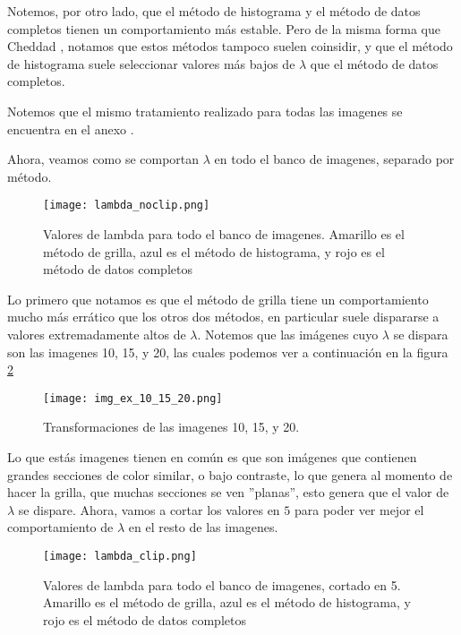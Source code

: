     Notemos, por otro lado, que el m\'etodo de histograma y el m\'etodo de datos completos tienen un comportamiento m\'as estable. Pero de la misma forma que Cheddad \cite{boxcoximg}, notamos que estos m\'etodos tampoco suelen coinsidir, y que el m\'etodo de histograma suele seleccionar valores m\'as bajos de $\lambda$ que el m\'etodo de datos completos.

    Notemos que el mismo tratamiento realizado para todas las imagenes se encuentra en el anexo .
    
    Ahora, veamos como se comportan $\lambda$ en todo el banco de imagenes, separado por m\'etodo.

    \begin{figure}[H]
        \texttt{[image: lambda\_noclip.png]}
        \caption{Valores de lambda para todo el banco de imagenes. Amarillo es el m\'etodo de grilla, azul es el m\'etodo de histograma, y rojo es el m\'etodo de datos completos}
        \label{fig:lambda_noclip}
    \end{figure}

    Lo primero que notamos es que el m\'etodo de grilla tiene un comportamiento mucho m\'as err\'atico que los otros dos m\'etodos, en particular suele dispararse a valores extremadamente altos de $\lambda$. Notemos que las im\'agenes cuyo $\lambda$ se dispara son las imagenes 10, 15, y 20, las cuales podemos ver a continuaci\'on en la figura \ref{fig:img_bci_10_15_20}

    \begin{figure}[H]
        \centering
        \texttt{[image: img\_ex\_10\_15\_20.png]}
        \caption{Transformaciones de las imagenes 10, 15, y 20.}
        \label{fig:img_bci_10_15_20}
    \end{figure}

    Lo que est\'as imagenes tienen en com\'un es que son im\'agenes que contienen grandes secciones de color similar, o bajo contraste, lo que genera al momento de hacer la grilla, que muchas secciones se ven ''planas'', esto genera que el valor de $\lambda$ se dispare. Ahora, vamos a cortar los valores en $5$ para poder ver mejor el comportamiento de $\lambda$ en el resto de las imagenes.

    \begin{figure}[H]
        \texttt{[image: lambda\_clip.png]}
        \caption{Valores de lambda para todo el banco de imagenes, cortado en 5. Amarillo es el m\'etodo de grilla, azul es el m\'etodo de histograma, y rojo es el m\'etodo de datos completos}
        \label{fig:lambda_clip}
    \end{figure}

